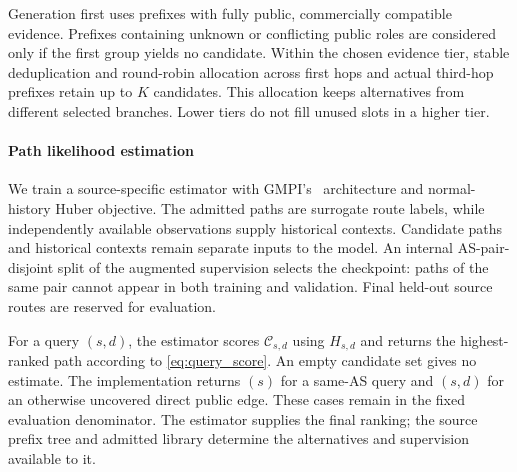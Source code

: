 Generation first uses prefixes with fully public, commercially
compatible evidence. Prefixes containing unknown or conflicting public
roles are considered only if the first group yields no candidate. Within
the chosen evidence tier, stable deduplication and round-robin allocation
across first hops and actual third-hop prefixes retain up to $K$
candidates. This allocation keeps alternatives from different selected
branches. Lower tiers do not fill unused slots in a higher tier.

\paragraph{Path likelihood estimation}
We train a source-specific estimator with GMPI's~\cite{li2023realizing}
architecture and normal-history Huber objective. The admitted paths are
surrogate route labels, while independently available observations supply
historical contexts. Candidate paths and historical contexts remain
separate inputs to the model. An internal AS-pair-disjoint split of the
augmented supervision selects the checkpoint: paths of the same pair
cannot appear in both training and validation. Final held-out source
routes are reserved for evaluation.

For a query $(s,d)$, the estimator scores $\mathcal C_{s,d}$ using
$H_{s,d}$ and returns the highest-ranked path according to
\eqref{eq:query_score}. An empty candidate set gives no estimate.
The implementation returns $(s)$ for a same-AS query and $(s,d)$ for an
otherwise uncovered direct public edge. These cases remain in the fixed
evaluation denominator. The estimator supplies the final ranking; the
source prefix tree and admitted library determine the alternatives and
supervision available to it.

